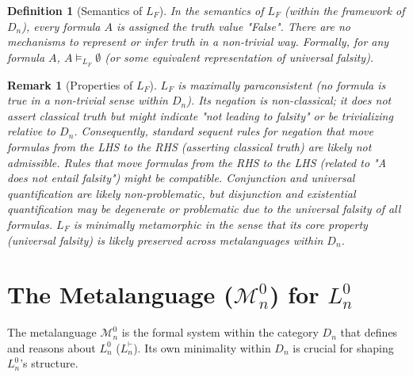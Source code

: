 \documentclass{article}
\newtheorem{definition}{Definition}[section] %
\newtheorem{remark}{Remark}[section] %
\newcommand{\LF}{L_F} %
\begin{document}
																																															\begin{definition}[Semantics of $\LF$]
																																																In the semantics of $\LF$ (within the framework of $D_n$), every formula $A$ is assigned the truth value "False". There are no mechanisms to represent or infer truth in a non-trivial way. Formally, for any formula $A$, $A \models_{\LF} \emptyset$ (or some equivalent representation of universal falsity).
																																																\end{definition}
																																																	
																																																	\begin{remark}[Properties of $\LF$]
																																																		$\LF$ is maximally paraconsistent (no formula is true in a non-trivial sense within $D_n$). Its negation is non-classical; it does not assert classical truth but might indicate "not leading to falsity" or be trivializing relative to $D_n$. Consequently, standard sequent rules for negation that move formulas from the LHS to the RHS (asserting classical truth) are likely not admissible. Rules that move formulas from the RHS to the LHS (related to "A does not entail falsity") might be compatible. Conjunction and universal quantification are likely non-problematic, but disjunction and existential quantification may be degenerate or problematic due to the universal falsity of all formulas. $\LF$ is minimally metamorphic in the sense that its core property (universal falsity) is likely preserved across metalanguages within $D_n$.
																																																		\end{remark}
																																																			
																																																			
																																																			\section{The Metalanguage ($\mathcal{M}^0_n$) for $L^0_n$}
																																																			
																																																			The metalanguage $\mathcal{M}^0_n$ is the formal system within the category $D_n$ that defines and reasons about $L^0_n$ ($L^{\vdash}_n$). Its own minimality within $D_n$ is crucial for shaping $L^0_n$'s structure.
																																																			
\end{document}
